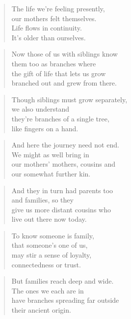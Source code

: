 \documentclass[14pt,a4paper]{article}
\begin{document}
\begin{verse}
The life we’re feeling presently,\\
our mothers felt themselves.\\
Life flows in continuity.\\
It’s older than ourselves.
\end{verse}

\begin{verse}
Now those of us with siblings know\\
them too as branches where\\
the gift of life that lets us grow\\
branched out and grew from there.
\end{verse}

\begin{verse}
Though siblings must grow separately,\\
we also understand\\
they’re branches of a single tree,\\
like fingers on a hand.
\end{verse}

\begin{verse}
And here the journey need not end.\\
We might as well bring in\\
our mothers’ mothers, cousins and\\
our somewhat further kin.
\end{verse}

\begin{verse}
And they in turn had parents too\\
and families, so they\\
give us more distant cousins who\\
live out there now today.
\end{verse}

\begin{verse}
To know someone is family,\\
that someone’s one of us,\\
may stir a sense of loyalty,\\
connectedness or trust.
\end{verse}

\begin{verse}
But families reach deep and wide.\\
The ones we each are in\\
have branches spreading far outside\\
their ancient origin.
\end{verse}
\end{document}
